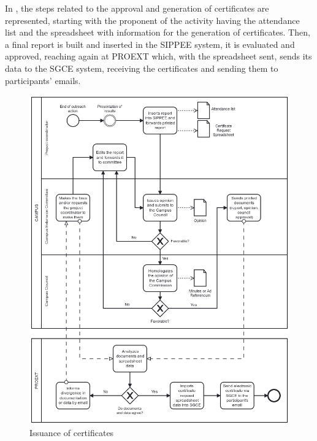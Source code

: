 
In , the steps related to the approval and generation of certificates are represented, starting with the proponent of the activity having the attendance list and the spreadsheet with information for the generation of certificates. 
Then, a final report is built and inserted in the \ac{SIPPEE} system, it is evaluated and approved, reaching again at \ac{PROEXT} which, with the spreadsheet sent, sends its data to the \ac{SGCE} system, receiving the certificates and sending them to participants' emails.

\begin{figure}[htb]
  \caption{Issuance of certificates}\label{fig:issuance-certificates}
  \begin{center}
    \includegraphics[width=16cm]{img/3-emissao-de-certificados.png}
  \end{center}
\end{figure}


